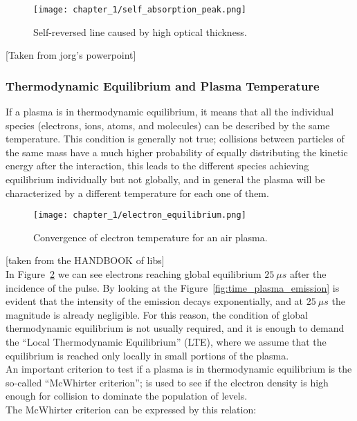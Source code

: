 \begin{figure}[H]
    \centering
    \texttt{[image: chapter\_1/self\_absorption\_peak.png]}
    \caption{Self-reversed line caused by high optical thickness.}
    \label{fig:self_absorbed_peak}
\end{figure}
[Taken from jorg's powerpoint]

\subsubsection{Thermodynamic Equilibrium and Plasma Temperature}
\label{subsubsec:thermodynamic_eq}

If a plasma is in thermodynamic equilibrium, it means that all the individual species (electrons, ions, atoms, and molecules) can be described by the same temperature. This condition is generally not true; collisions between particles of the same mass have a much higher probability of equally distributing the kinetic energy after the interaction, this leads to the different species achieving equilibrium individually but not globally, and in general the plasma will be characterized by a different temperature for each one of them.

\begin{figure}[H]
    \centering
    \texttt{[image: chapter\_1/electron\_equilibrium.png]}
    \caption{Convergence of electron temperature for an air plasma.}
    \label{fig:electron_equilibrium}
\end{figure}
[taken from the HANDBOOK of libs]\\
In Figure~\ref{fig:electron_equilibrium} we can see electrons reaching global equilibrium $25\:\mu s$ after the incidence of the pulse. By looking at the Figure~\ref{fig:time_plasma_emission} is evident that the intensity of the emission decays exponentially, and at $25\: \mu s$ the magnitude is already negligible. For this reason, the condition of global thermodynamic equilibrium is not usually required, and it is enough to demand the “Local Thermodynamic Equilibrium” (LTE), where we assume that the equilibrium is reached only locally in small portions of the plasma.
\\
An important criterion to test if a plasma is in thermodynamic equilibrium is the so-called “McWhirter criterion”; is used to see if the electron density is high enough for collision to dominate the population of levels. 
\\
The McWhirter criterion can be expressed by this relation: 


